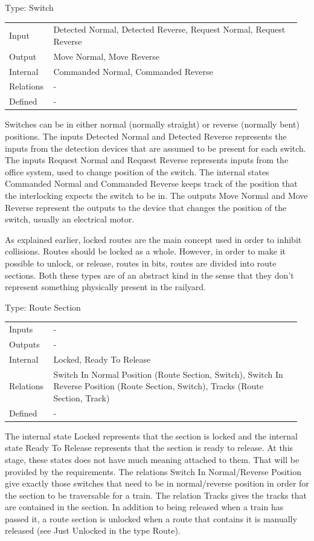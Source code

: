 \documentclass[10pt,a4paper]{article}
\makeatletter
\newcommand{\lab}[1]{\textcolor{Muted}{#1}}
\newenvironment{typerows}
  {\renewcommand{\arraystretch}{1.25}\small
   \begin{tabular}{@{}>{\raggedright\arraybackslash}p{0.14\linewidth}>{\raggedright\arraybackslash}p{0.82\linewidth}@{}}}
  {\end{tabular}}
\makeatother
\begin{document}
\begin{typecard}{Type: Switch}
\begin{typerows}
\lab{Input} & Detected Normal, Detected Reverse, Request Normal, Request Reverse \\
\lab{Output} & Move Normal, Move Reverse \\
\lab{Internal} & Commanded Normal, Commanded Reverse \\
\lab{Relations} & - \\
\lab{Defined} & - \\
\end{typerows}
\end{typecard}
Switches can be in either normal (normally straight) or reverse (normally bent) positions. The inputs Detected Normal and Detected Reverse represents the inputs from the detection devices that are assumed to be present for each switch. The inputs Request Normal and Request Reverse represents inputs from the office system, used to change position of the switch. The internal states Commanded Normal and Commanded Reverse keeps track of the position that the interlocking expects the switch to be in. The outputs Move Normal and Move Reverse represent the outputs to the device that changes the position of the switch, usually an electrical motor.

\vspace{2mm}
As explained earlier, locked routes are the main concept used in order to inhibit collisions. Routes should be locked as a whole. However, in order to make it possible to unlock, or release, routes in bits, routes are divided into route sections. Both these types are of an abstract kind in the sense that they don't represent something physically present in the railyard.

\begin{typecard}{Type: Route Section}
\begin{typerows}
\lab{Inputs} & - \\
\lab{Outputs} & - \\
\lab{Internal} & Locked, Ready To Release \\
\lab{Relations} & Switch In Normal Position (Route Section, Switch), Switch In Reverse Position (Route Section, Switch), Tracks (Route Section, Track) \\
\lab{Defined} & - \\
\end{typerows}
\end{typecard}
The internal state Locked represents that the section is locked and the internal state Ready To Release represents that the section is ready to release. At this stage, these states does not have much meaning attached to them. That will be provided by the requirements. The relations Switch In Normal/Reverse Position give exactly those switches that need to be in normal/reverse position in order for the section to be traversable for a train. The relation Tracks gives the tracks that are contained in the section. In addition to being released when a train has passed it, a route section is unlocked when a route that contains it is manually released (see Just Unlocked in the type Route).
\end{document}
